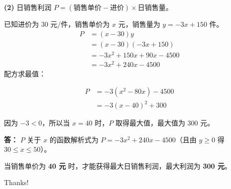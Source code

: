 \documentclass[10pt,aspectratio=169,serif,fleqn]{beamer}
\begin{document}
\begin{frame}
	\begin{tcolorbox}[colback=orange!10,colframe=orange,sidebyside,title=\textbf{解：}]		
		
		
		\textbf{(2)} 日销售利润 \(P = (\text{销售单价} - \text{进价}) \times \text{日销售量}\)。
		
		已知进价为 30 元/件，销售单价为 \(x\) 元，销售量为 \(y = -3x + 150\) 件。
		\begin{align*}
			P &= (x - 30)y \\
			&= (x - 30)(-3x + 150) \\
			&= -3x^2 + 150x + 90x - 4500 \\
			&= -3x^2 + 240x - 4500
		\end{align*}
		配方求最值：
		\tcblower
		
		\begin{align*}
			P &= -3(x^2 - 80x) - 4500 \\
			&= -3(x - 40)^2 + 300
		\end{align*}
		
		因为 \(-3 < 0\)，所以当 \(x = 40\) 时，\(P\) 取得最大值，最大值为 300 元。
		
		\textbf{答：}
		\(P\) 关于 \(x\) 的函数解析式为 \(P = -3x^2 + 240x - 4500\)（且由 \(y \ge 0\) 得 \(30 \le x \le 50\)）。
		
		当销售单价为 \textbf{40 元} 时，才能获得最大日销售利润，最大利润为 \textbf{300 元}。
		
	\end{tcolorbox}
\end{frame}


\begin{frame}[c]
	\begin{center}
		{\Huge\calligra Thanks!}
	\end{center}
\end{frame}
\end{document}
